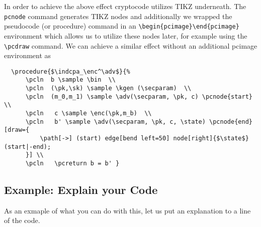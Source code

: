 \documentclass[a4paper]{report}
\begin{document}
  In order to achieve the above effect cryptocode utilizes TIKZ underneath. The
  \lstinline$pcnode$ command generates TIKZ nodes and additionally we wrapped the 
  pseudocode (or procedure) command in an \lstinline$\begin{pcimage}\end{pcimage}$ environment
  which allows us to utilize these nodes later, for example using the  \lstinline$\pcdraw$
  command. We can achieve a similar effect without an additional pcimage environment as
  
  \begin{lstlisting}
  \procedure{$\indcpa_\enc^\adv$}{%
	  \pcln  b \sample \bin  \\
	  \pcln  (\pk,\sk) \sample \kgen (\secparam)  \\
	  \pcln  (m_0,m_1) \sample \adv(\secparam, \pk, c) \pcnode{start}  \\
	  \pcln   c \sample \enc(\pk,m_b)  \\
	  \pcln   b' \sample \adv(\secparam, \pk, c, \state) \pcnode{end}[draw={
		  \path[->] (start) edge[bend left=50] node[right]{$\state$} (start|-end);
	  }] \\
	  \pcln   \pcreturn b = b' }
  \end{lstlisting}
  
  \pagebreak
  \subsection{Example: Explain your Code}
  As an exmaple of what you can do with this, let us put an explanation to a line of the code.
  
  \begin{center}
  \begin{pcimage}
  
  \end{pcimage}
  \end{center}
  
\end{document}
